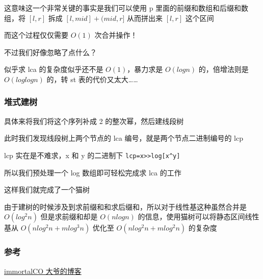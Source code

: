 这意味这一个非常关键的事实是我们可以使用 p 里面的前缀和数组和后缀和数组，将 $[l,r]$ 拆成 $[l,mid]+(mid,r]$ 从而拼出来 $[l,r]$ 这个区间

而这个过程仅仅需要 $O(1)$ 次合并操作！

不过我们好像忽略了点什么？

似乎求 lca 的复杂度似乎还不是 $O(1)$，暴力求是 $O(logn)$ 的，倍增法则是 $O(loglogn)$ 的，转 st 表的代价又太大……

\subsubsection{堆式建树}

具体来将我们将这个序列补成 2 的整次幂，然后建线段树

此时我们发现线段树上两个节点的 lca 编号，就是两个节点二进制编号的 lcp

lcp 实在是不难求，x 和 y 的二进制下 \texttt{lcp=x>>log[x^y]}

所以我们预处理一个 log 数组即可轻松完成求 lca 的工作

这样我们就完成了一个猫树

由于建树的时候涉及到求前缀和和求后缀和，所以对于线性基这种虽然合并是 $O(log^2n)$ 但是求前缀和却是 $O(nlogn)$ 的信息，使用猫树可以将静态区间线性基从 $O(nlog^2n+mlog^3n)$ 优化至 $O(nlog^2n+mlog^2n)$ 的复杂度

\subsubsection{参考}

\href{http://immortalco.blog.uoj.ac/blog/2102}{immortalCO 大爷的博客}
